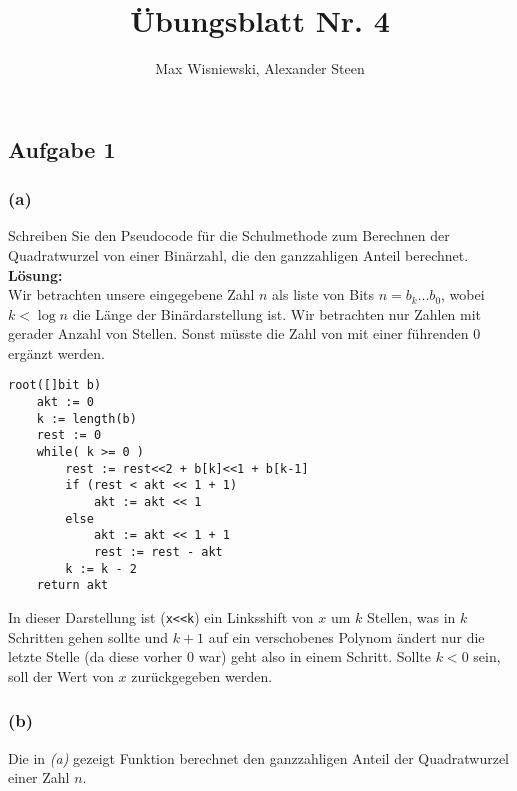 \documentclass[11pt,a4paper,ngerman]{article}
\date{}
\title{Übungsblatt Nr. 4}
\author{Max Wisniewski, Alexander Steen}
\begin{document}
\renewcommand{\figurename}{Figure}
\maketitle
\thispagestyle{fancy}

\subsection*{Aufgabe 1}

\subsubsection*{(a)}

Schreiben Sie den Pseudocode für die Schulmethode zum Berechnen der Quadratwurzel von einer Binärzahl, die den ganzzahligen Anteil berechnet.\\

\textbf{Lösung:}\\

Wir betrachten unsere eingegebene Zahl $n$ als liste von Bits $n=b_k...b_0$, wobei $k < \log n$ die Länge der Binärdarstellung ist.
Wir betrachten nur Zahlen mit gerader Anzahl von Stellen. Sonst müsste die Zahl von mit einer führenden $0$ ergänzt werden.

\begin{lstlisting}[frame=single]
root([]bit b)
    akt := 0
    k := length(b)
    rest := 0
    while( k >= 0 )
        rest := rest<<2 + b[k]<<1 + b[k-1]
        if (rest < akt << 1 + 1)
            akt := akt << 1
        else
            akt := akt << 1 + 1
            rest := rest - akt
        k := k - 2
    return akt
\end{lstlisting}

In dieser Darstellung ist (\lstinline|x<<k|) ein Linksshift von $x$ um $k$ Stellen, was in $k$ Schritten gehen sollte und $k+1$ auf ein verschobenes
Polynom ändert nur die letzte Stelle (da diese vorher 0 war) geht also in einem Schritt. Sollte $k<0$ sein, soll der Wert von $x$ zurückgegeben werden.\\

\subsubsection*{(b)}

Die in \emph{(a)} gezeigt Funktion berechnet den ganzzahligen Anteil der Quadratwurzel einer Zahl $n$.\\
\end{document}
